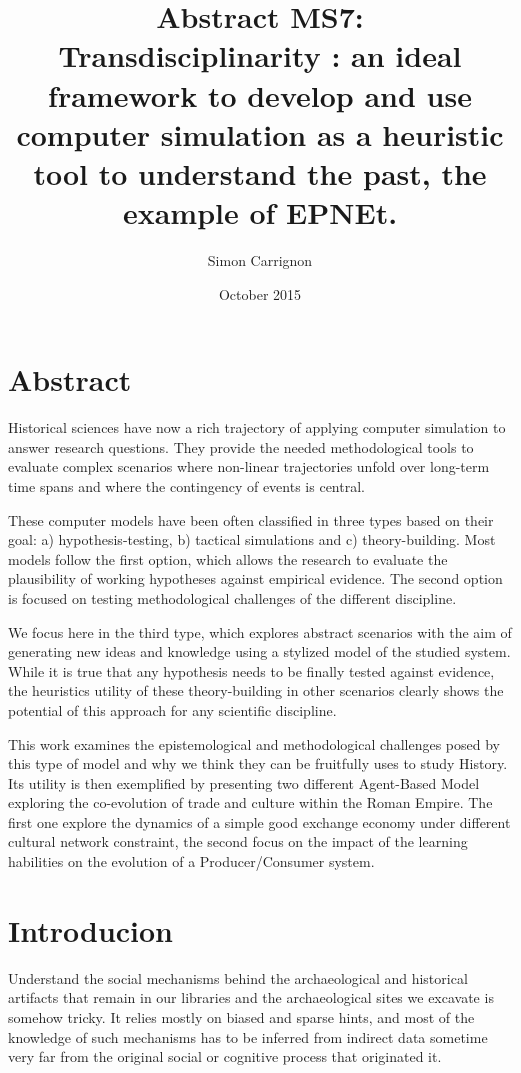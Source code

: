 \documentclass[a4paper]{article}
\title{Abstract MS7:\\ Transdisciplinarity : an ideal framework to develop and use computer simulation as a heuristic tool to understand the past, the example of EPNEt.}
\author{Simon Carrignon}
\date{October 2015}
\begin{document}
\maketitle 


\section*{Abstract}
Historical sciences have now a rich trajectory of applying computer simulation to answer research questions. They provide the needed methodological tools to evaluate complex scenarios where non-linear trajectories unfold over long-term time spans and where the contingency of events is central.

These computer models have been often classified in three types based on their goal: a) hypothesis-testing, b) tactical simulations and c) theory-building. Most models follow the first option, which allows the research to evaluate the plausibility of working hypotheses against empirical evidence. The second option is focused on testing methodological challenges of the different discipline.

We focus here in the third type, which explores abstract scenarios with the aim of generating new ideas and knowledge using a stylized model of the studied system. While it is true that any hypothesis needs to be finally tested against evidence, the heuristics utility of these theory-building in other scenarios clearly shows the potential of this approach for any scientific discipline. 

This work examines the epistemological and methodological challenges posed by this type of model and why we think they can be fruitfully uses to study History. Its utility is then exemplified by presenting two different Agent-Based Model exploring the co-evolution of trade and culture within the Roman Empire. The first one explore the dynamics of a simple good exchange economy under different cultural network constraint, the second focus on the impact of the learning habilities on the evolution of a Producer/Consumer system.

\section{Introducion}
Understand the social mechanisms behind the archaeological and historical artifacts that remain in our libraries and the archaeological sites we excavate is somehow tricky. It relies mostly on biased and sparse hints, and most of the knowledge of such mechanisms has to be inferred from indirect data sometime very far from the original social or cognitive process that originated it.
\end{document}
